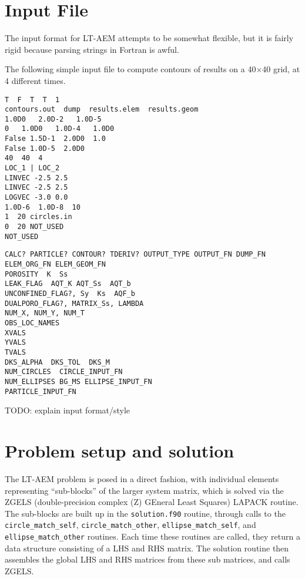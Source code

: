\documentclass[12pt,letterpaper]{article}
\begin{document}
\section{Input File}
\label{sec:input}
The input format for LT-AEM attempts to be somewhat flexible,  but it is fairly rigid because parsing strings in Fortran is awful.  

The following simple input file to compute contours of results on a 40$\times$40
grid, at 4 different times.

\begin{verbatim}
T  F  T  T  1  
contours.out  dump  results.elem  results.geom  
1.0D0   2.0D-2   1.0D-5   
0   1.0D0   1.0D-4   1.0D0   
False 1.5D-1  2.0D0  1.0  
False 1.0D-5  2.0D0    
40  40  4  
LOC_1 | LOC_2
LINVEC -2.5 2.5 
LINVEC -2.5 2.5 
LOGVEC -3.0 0.0
1.0D-6  1.0D-8  10  
1  20 circles.in   
0  20 NOT_USED  
NOT_USED  
\end{verbatim}

\begin{verbatim}
CALC? PARTICLE? CONTOUR? TDERIV? OUTPUT_TYPE OUTPUT_FN DUMP_FN ELEM_ORG_FN ELEM_GEOM_FN  
POROSITY  K  Ss   
LEAK_FLAG  AQT_K AQT_Ss  AQT_b  
UNCONFINED_FLAG?, Sy  Ks  AQF_b
DUALPORO_FLAG?, MATRIX_Ss, LAMBDA
NUM_X, NUM_Y, NUM_T
OBS_LOC_NAMES
XVALS
YVALS
TVALS
DKS_ALPHA  DKS_TOL  DKS_M  
NUM_CIRCLES  CIRCLE_INPUT_FN   
NUM_ELLIPSES BG_MS ELLIPSE_INPUT_FN
PARTICLE_INPUT_FN
\end{verbatim}

TODO: explain input format/style

\section{Problem setup and solution}
\label{sec:problem-setup}
The LT-AEM problem is posed in a direct fashion, with individual
elements representing ``sub-blocks'' of the larger system matrix,
which is solved via the ZGELS (double-precision complex (Z) GEneral
Least Squares) LAPACK routine. The sub-blocks are built up in the
\texttt{solution.f90} routine, through calls to the
\texttt{circle\_match\_self}, \texttt{circle\_match\_other},
\texttt{ellipse\_match\_self}, and \texttt{ellipse\_match\_other}
routines.  Each time these routines are called, they return a data
structure consisting of a LHS and RHS matrix.  The solution routine
then assembles the global LHS and RHS matrices from these sub
matrices, and calls ZGELS.
\end{document}
